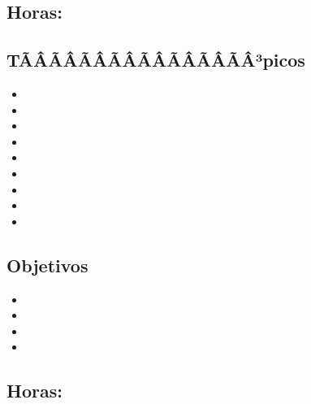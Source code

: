\subsection{\DSDOSDef}\label{sec:BOK-DS2}
\subsection*{Horas: \DSDOSHours}

\subsection*{TÃÂÃÂÃÂÃÂÃÂÃÂÃÂÃÂ³picos}
\begin{itemize}
	\item \DSDOSTopicLogica
	\item \DSDOSTopicConectivos
	\item \DSDOSTopicTablas
	\item \DSDOSTopicFormas
	\item \DSDOSTopicValidacion
	\item \DSDOSTopicLogicade
	\item \DSDOSTopicCuantificacion
	\item \DSDOSTopicModus
	\item \DSDOSTopicLimitaciones
\end{itemize}

\subsection*{Objetivos}
\begin{itemize}
	\item \DSDOSObjUNO
	\item \DSDOSObjDOS
	\item \DSDOSObjTRES
	\item \DSDOSObjCUATRO
\end{itemize}

\subsection{\DSTRESDef}\label{sec:BOK-DS3}
\subsection*{Horas: \DSTRESHours}

